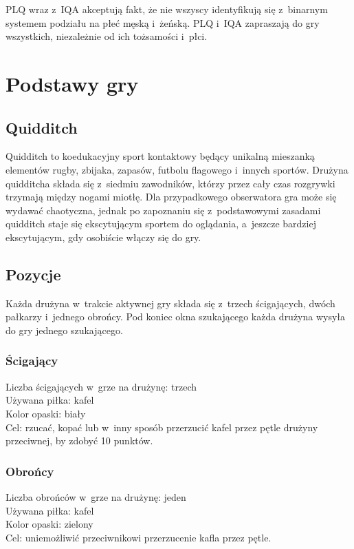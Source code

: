 \documentclass[12pt]{article}
\begin{document}
PLQ wraz z~IQA akceptują fakt, że nie wszyscy identyfikują się z~binarnym systemem podziału na płeć męską i~żeńską. PLQ i~IQA zapraszają
do gry wszystkich, niezależnie od ich tożsamości i~płci.

\pagebreak
\section{Podstawy gry}

\subsection{Quidditch}

Quidditch to koedukacyjny sport kontaktowy będący unikalną mieszanką
elementów rugby, zbijaka, zapasów, futbolu flagowego i~innych sportów.
Drużyna quidditcha składa się z~siedmiu zawodników, którzy przez cały
czas rozgrywki trzymają między nogami miotłę. Dla przypadkowego
obserwatora gra może się wydawać chaotyczna, jednak po zapoznaniu się z~podstawowymi zasadami quidditch staje się ekscytującym sportem do
oglądania, a~jeszcze bardziej ekscytującym, gdy osobiście włączy się do
gry.

\subsection{Pozycje}
Każda drużyna w~trakcie aktywnej gry składa się z~trzech ścigających,
dwóch pałkarzy i~jednego obrońcy. Pod koniec okna szukającego każda
drużyna wysyła do gry jednego szukającego.

\subsubsection{Ścigający}
Liczba ścigających w~grze na drużynę: trzech \\
Używana piłka: kafel \\
Kolor opaski: biały \\
Cel: rzucać, kopać lub w~inny sposób przerzucić kafel przez pętle
drużyny przeciwnej, by zdobyć 10 punktów.

\subsubsection{Obrońcy}
Liczba obrońców w~grze na drużynę: jeden \\
Używana piłka: kafel \\
Kolor opaski: zielony \\
Cel: uniemożliwić przeciwnikowi przerzucenie kafla przez pętle.
\end{document}
